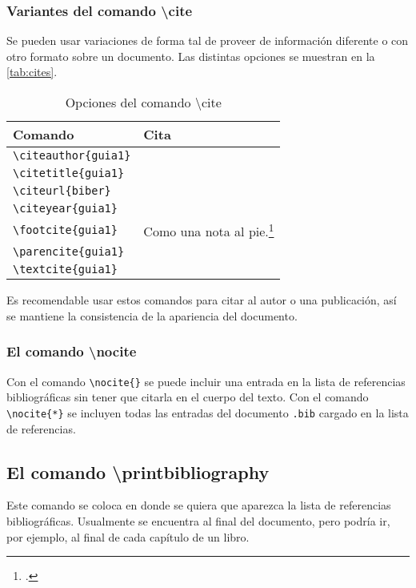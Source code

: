\clearpage
\subsubsection{Variantes del comando \textbackslash cite}

Se pueden usar variaciones de forma tal de proveer de información diferente o con otro formato sobre un documento. Las distintas opciones se muestran en la \autoref{tab:cites}. 

\begin{savenotes}
	\begin{table}[h] 
		\centering
		\caption{Opciones del comando \textbackslash cite{}}
		\begin{tabular}{ll}
			\toprule Comando				& Cita \\ 
			\midrule \verb|\citeauthor{guia1}| 	& 	\citeauthor{guia1} \\
			\verb|\citetitle{guia1}| 	& 	\citetitle{guia1} \\
			\verb|\citeurl{biber}| 		& 	\citeurl{biber} \\
			\verb|\citeyear{guia1}| 	& 	\citeyear{guia1} \\
			\verb|\footcite{guia1}| 	& 	Como una nota al pie.\footcite{guia1} \\
			\verb|\parencite{guia1}| 	& 	\parencite{guia1} \\
			\verb|\textcite{guia1}| 	& 	\textcite{guia1} \\
			\bottomrule
		\end{tabular}
		\label{tab:cites}
	\end{table}
\end{savenotes}

Es recomendable usar estos comandos para citar al autor o una publicación, así se mantiene la consistencia de la apariencia del documento. 

\subsubsection{El comando \textbackslash nocite}

Con el comando \verb|\nocite{}| se puede incluir una entrada en la lista de referencias bibliográficas sin tener que citarla en el cuerpo del texto. Con el comando \verb|\nocite{*}| se incluyen todas las entradas del documento \verb|.bib| cargado en la lista de referencias.

\subsection{El comando \textbackslash printbibliography}
Este comando se coloca en donde se quiera que aparezca la lista de referencias bibliográficas. Usualmente se encuentra al final del documento, pero podría ir, por ejemplo, al final de cada capítulo de un libro.

